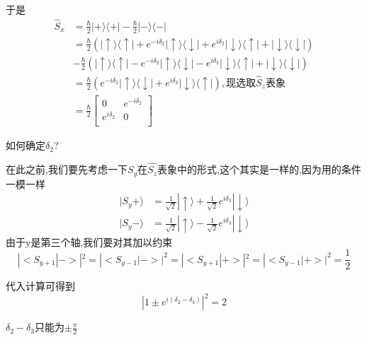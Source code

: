 \documentclass[lang=cn,10pt]{elegantbook}
\begin{document}
 于是
 \begin{equation*}
 	\begin{split}
 		\hat{S}_x&=\frac{\hbar}{2}|+\rangle \langle +|-\frac{\hbar}{2}|-\rangle \langle -|
 		\\
 		&=\frac{\hbar}{2}\left( |\uparrow \rangle \langle \uparrow |+e^{-i\delta _2}|\uparrow \rangle \langle \downarrow |+e^{i\delta _2}|\downarrow \rangle \langle \uparrow |+|\downarrow \rangle \langle \downarrow | \right)\\ &-\frac{\hbar}{2}\left( |\uparrow \rangle \langle \uparrow |-e^{-i\delta _2}|\uparrow \rangle \langle \downarrow |-e^{i\delta _2}|\downarrow \rangle \langle \uparrow |+|\downarrow \rangle \langle \downarrow | \right) 
 		\\
 		&=\frac{\hbar}{2}\left( e^{-i\delta _2}|\uparrow \rangle \langle \downarrow |+e^{i\delta _2}|\downarrow \rangle \langle \uparrow | \right) ,\text{现选取}\hat{S}_z\text{表象}
 		\\
 		&=\frac{\hbar}{2}\left[ \begin{matrix}
 			0&		e^{-i\delta _2}\\
 			e^{i\delta _2}&		0\\
 		\end{matrix} \right] 
 	\end{split}
 \end{equation*}
 
 如何确定$\delta_2$?
 
 在此之前,我们要先考虑一下$\hat{S_y}$在$\hat{S_z}$表象中的形式,这个其实是一样的,因为用的条件一模一样
  \begin{equation*}
 	\begin{split}
 		|S_y+\rangle &=\frac{1}{\sqrt{2}}|\uparrow \rangle +\frac{1}{\sqrt{2}}e^{i\delta _3}|\downarrow \rangle 
 		\\
 		|S_y-\rangle &=\frac{1}{\sqrt{2}}|\uparrow \rangle -\frac{1}{\sqrt{2}}e^{i\delta _3}|\downarrow \rangle 
 	\end{split}
 \end{equation*}
 由于y是第三个轴,我们要对其加以约束
 \begin{equation*}
 	|<S_{y+1}|->|^{2}=|<S_{y-1}|->|^{2}= |<S_{y+1}|+>|^{2}= |<S_{y-1}|+>|^{2}=\frac{1}{2}
 \end{equation*}
 
 代入计算可得到
 \begin{equation*}
 	|1\pm e^{i\left( \delta _2-\delta _3 \right)}|^2=2
 \end{equation*}
 
$ \delta _2-\delta _3$只能为$\pm \frac{\pi}{2}$
\end{document}
